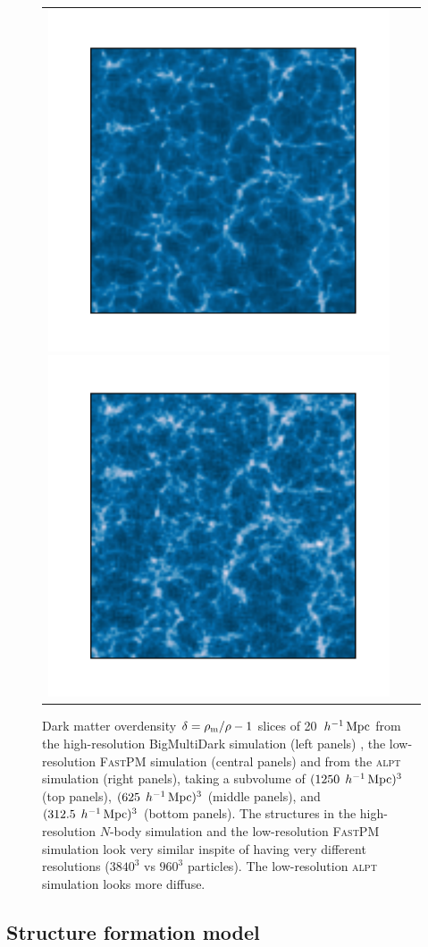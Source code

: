 \documentclass[english,usenatbib]{mn2e}
\newcommand{\mperh}{\,h^{-1}\,{\rm Mpc}}
\begin{document}
\begin{figure}
\begin{tabular}{ccc}
\includegraphics[width=0.6\columnwidth]{fastpm_small}
\includegraphics[width=0.6\columnwidth]{alpt_small}
\end{tabular}
\caption{\label{fig:darkmatter} Dark matter overdensity $\delta = \rho_{\rm m}/\rho -1$ slices of 20 $\mperh$ from the high-resolution BigMultiDark simulation (left panels) , the low-resolution \textsc{FastPM} simulation (central panels) and from the \textsc{alpt} simulation (right panels), taking a subvolume of $(1250 \;\mperh)^3$ (top panels), $(625 \;\mperh)^3$ (middle panels), and $(312.5 \;\mperh)^3$ (bottom panels). The structures in the high-resolution $N$-body simulation and the low-resolution \textsc{FastPM} simulation look very similar inspite of having very different resolutions ($3840^3$ vs $960^3$ particles). The low-resolution \textsc{alpt} simulation looks more diffuse.}
\end{figure}

\subsection{Structure formation model}
\label{sec:sf}
\end{document}
